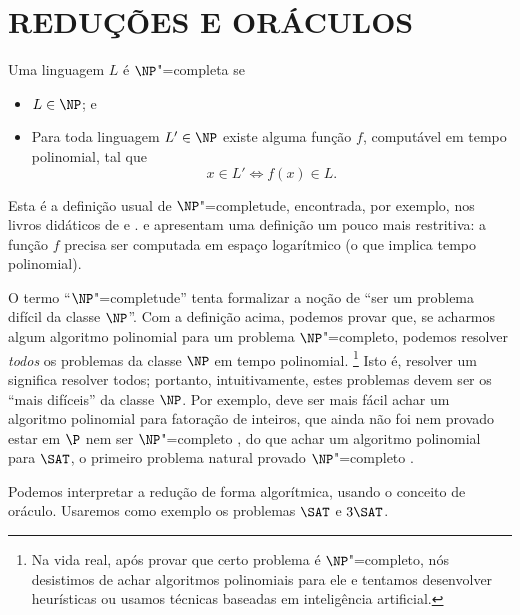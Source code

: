 \section{REDUÇÕES E ORÁCULOS}
\label{sec:oracles_and_reductions}

\begin{definition}[$\NP$"=completude]
    Uma linguagem $L$ é $\NP$"=completa se
    \begin{itemize}
        \item $L \in \NP$; e
        \item Para toda linguagem $L' \in \NP$ existe alguma função $f$,
            computável em tempo polinomial,
            tal que
            \begin{equation*}
                x \in L' \iff f(x) \in L.
            \end{equation*}
    \end{itemize}
\end{definition}

Esta é a definição usual de $\NP$"=completude,
encontrada, por exemplo,
nos livros didáticos de 
e .
 e 
apresentam uma definição um pouco mais restritiva:
a função $f$ precisa ser computada em espaço logarítmico
(o que implica tempo polinomial).

O termo ``$\NP$"=completude'' tenta formalizar a noção de
``ser um problema difícil da classe $\NP$''.
Com a definição acima,
podemos provar que,
se acharmos algum algoritmo polinomial para um problema $\NP$"=completo,
podemos resolver \emph{todos} os problemas da classe $\NP$ em tempo polinomial.%
\footnote{
    Na vida real,
    após provar que certo problema é $\NP$"=completo,
    nós desistimos de achar algoritmos polinomiais para ele
    e tentamos desenvolver heurísticas
    ou usamos técnicas baseadas em inteligência artificial.
}
Isto é,
resolver um significa resolver todos;
portanto,
intuitivamente,
estes problemas devem ser os ``mais difíceis'' da classe $\NP$.
Por exemplo,
deve ser mais fácil achar um algoritmo polinomial para fatoração de inteiros,
que ainda não foi nem provado estar em $\P$
nem ser $\NP$"=completo \cite[p.~120]{DuKo2014},
do que achar um algoritmo polinomial para $\SAT$,
o primeiro problema natural provado $\NP$"=completo \cite[p.~80]{DuKo2014}.

Podemos interpretar a redução de forma algorítmica,
usando o conceito de oráculo.
Usaremos como exemplo os problemas $\SAT$ e $3\SAT$.

